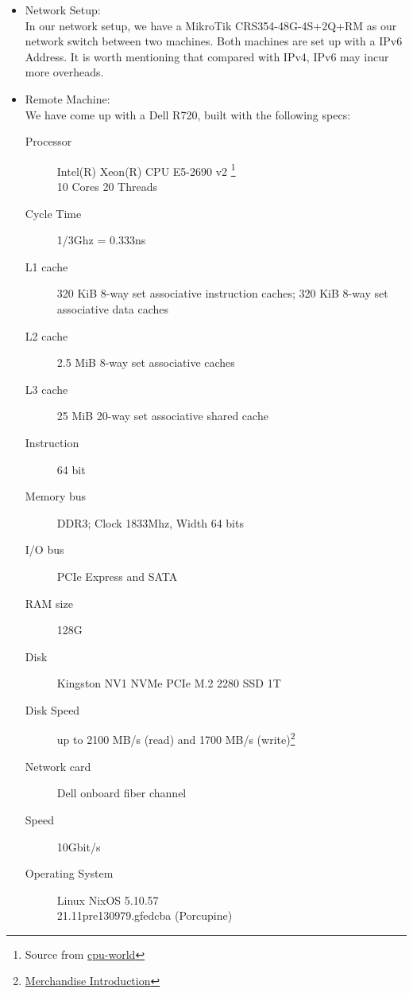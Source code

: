 \begin{itemize}
    \item Network Setup: \\ In our network setup, we have a MikroTik CRS354-48G-4S+2Q+RM as our network switch between two machines. Both machines are set up with a IPv6 Address. It is worth mentioning that compared with IPv4, IPv6 may incur more overheads. 
    \item Remote Machine: \\
        We have come up with a Dell R720, built with the following specs: 
        
        \begin{description}
          
        \item[Processor] Intel(R) Xeon(R) CPU E5-2690 v2 \footnote{Source from \href{https://www.cpu-world.com/CPUs/Xeon/Intel-Xeon\%20E5-2690\%20v2.html}{cpu-world}} \\ 10 Cores 20 Threads
        \item[Cycle Time] 1/3Ghz = 0.333ns
        \item[L1 cache] 320 KiB 8-way set associative instruction caches; 320 KiB 8-way set associative data caches
        \item[L2 cache] 2.5 MiB 8-way set associative caches
        \item[L3 cache] 25 MiB 20-way set associative shared cache
        \item [Instruction] 64 bit
        \item[Memory bus] DDR3; Clock 1833Mhz, Width 64 bits 
        \item[I/O bus] PCIe Express and SATA
        \item[RAM size] 128G
        \item[Disk] Kingston NV1 NVMe PCIe M.2 2280 SSD 1T
        \item[Disk Speed] up to 2100 MB/s (read) and 1700 MB/s (write)\footnote{\href{https://www.kingston.com/unitedstates/en/ssd/nv1-nvme-pcie-ssd}{Merchandise Introduction}}
        \item[Network card] Dell onboard fiber channel
        \item[Speed] 10Gbit/s
        \item[Operating System] Linux NixOS 5.10.57 \\ 21.11pre130979.gfedcba (Porcupine)
        \end{description}
\end{itemize}

